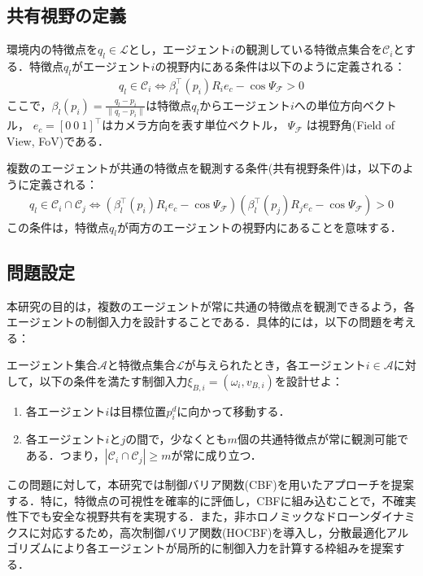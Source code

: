 \subsection{共有視野の定義}

環境内の特徴点を$q_l \in \mathcal{L}$とし，エージェント$i$の観測している特徴点集合を$\mathcal{C}_i$とする．特徴点$q_l$がエージェント$i$の視野内にある条件は以下のように定義される：
\begin{equation}
\begin{aligned}
q_l \in \mathcal{C}_i \iff \beta_l^{\top}(p_i)R_ie_c - \cos\Psi_\mathcal{F} > 0
\label{eq:fov_condition}
\end{aligned}
\end{equation}
ここで，$\beta_l(p_i) = \frac{q_l-p_i}{\|q_l-p_i\|}$は特徴点$q_l$からエージェント$i$への単位方向ベクトル，
$e_c = [0\:0\:1]^\top$はカメラ方向を表す単位ベクトル，
$\Psi_{\mathcal{F}}$
は視野角(Field of View, FoV)である．

複数のエージェントが共通の特徴点を観測する条件(共有視野条件)は，以下のように定義される：
\begin{equation}
\begin{aligned}
q_l \in \mathcal{C}_i \cap \mathcal{C}_j \iff (\beta_l^{\top}(p_i)R_ie_c - \cos\Psi_\mathcal{F})(\beta_l^{\top}(p_j)R_je_c - \cos\Psi_\mathcal{F}) > 0
\label{eq:shared_fov_condition}
\end{aligned}
\end{equation}
この条件は，特徴点$q_l$が両方のエージェントの視野内にあることを意味する．

\subsection{問題設定}

本研究の目的は，複数のエージェントが常に共通の特徴点を観測できるよう，各エージェントの制御入力を設計することである．具体的には，以下の問題を考える：

\begin{dfn}[共有視野保証問題]
エージェント集合$\mathcal{A}$と特徴点集合$\mathcal{L}$が与えられたとき，各エージェント$i \in \mathcal{A}$に対して，以下の条件を満たす制御入力$\xi_{B,i} = (\omega_i, v_{B,i})$を設計せよ：
\begin{enumerate}
\item 各エージェント$i$は目標位置$p_i^d$に向かって移動する．
\item 各エージェント$i$と$j$の間で，少なくとも$m$個の共通特徴点が常に観測可能である．つまり，$|\mathcal{C}_i \cap \mathcal{C}_j| \geq m$が常に成り立つ．
\end{enumerate}
\end{dfn}

この問題に対して，本研究では制御バリア関数(CBF)を用いたアプローチを提案する．特に，特徴点の可視性を確率的に評価し，CBFに組み込むことで，不確実性下でも安全な視野共有を実現する．また，非ホロノミックなドローンダイナミクスに対応するため，高次制御バリア関数(HOCBF)を導入し，分散最適化アルゴリズムにより各エージェントが局所的に制御入力を計算する枠組みを提案する．
